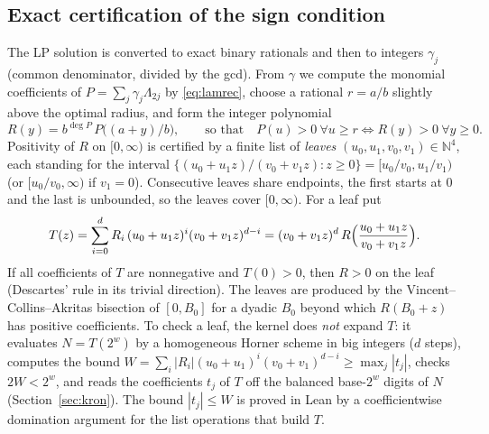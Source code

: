 \documentclass[11pt]{article}
\numberwithin{equation}{section}
\theoremstyle{definition}
\theoremstyle{remark}
\begin{document}
\subsection{Exact certification of the sign condition}\label{sec:su-cert}
The LP solution is converted to exact binary rationals and then to integers $\gamma_j$ (common
denominator, divided by the gcd). From $\gamma$ we compute the monomial coefficients of
$P=\sum_j\gamma_j\Lambda_{2j}$ by \eqref{eq:lamrec}, choose a rational $r=a/b$ slightly above the optimal
radius, and form the integer polynomial
\[
R(y)=b^{\deg P}\,P\bigl((a+y)/b\bigr),\qquad\text{so that}\quad P(u)>0\ \forall u\ge r \iff R(y)>0\ \forall y\ge0 .
\]
Positivity of $R$ on $[0,\infty)$ is certified by a finite list of \emph{leaves}
$(u_0,u_1,v_0,v_1)\in\mathbb N^4$, each standing for the interval
$\{(u_0+u_1z)/(v_0+v_1z): z\ge0\}=[u_0/v_0,u_1/v_1)$ (or $[u_0/v_0,\infty)$ if $v_1=0$).
Consecutive leaves share endpoints, the first starts at $0$ and the last is unbounded, so the leaves
cover $[0,\infty)$. For a leaf put
\[
T(z)=\sum_{i=0}^{d}R_i\,(u_0+u_1z)^i(v_0+v_1z)^{d-i}=(v_0+v_1z)^d\,R\Bigl(\frac{u_0+u_1z}{v_0+v_1z}\Bigr).
\]
If all coefficients of $T$ are nonnegative and $T(0)>0$, then $R>0$ on the leaf (Descartes' rule in
its trivial direction). The leaves are produced by the Vincent--Collins--Akritas bisection of $[0,B_0]$
for a dyadic $B_0$ beyond which $R(B_0+z)$ has positive coefficients. To check a leaf, the kernel does
\emph{not} expand $T$: it evaluates $N=T(2^w)$ by a homogeneous Horner scheme in big integers ($d$
steps), computes the bound $W=\sum_i|R_i|(u_0+u_1)^i(v_0+v_1)^{d-i}\ge\max_j|t_j|$, checks $2W<2^w$, and
reads the coefficients $t_j$ of $T$ off the balanced base-$2^w$ digits of $N$ (Section~\ref{sec:kron}).
The bound $|t_j|\le W$ is proved in Lean by a coefficientwise domination argument for the list
operations that build $T$.
\end{document}
